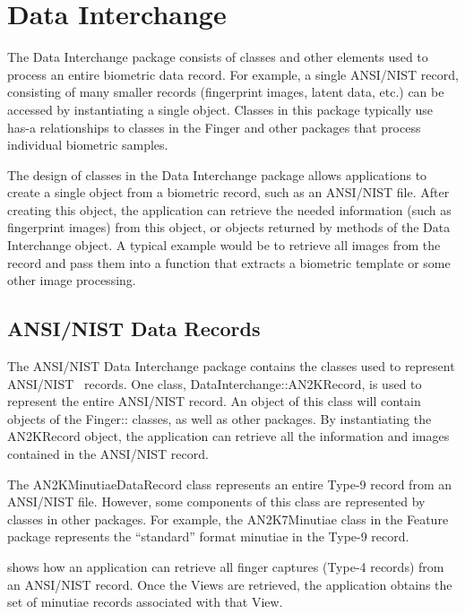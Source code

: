 %
%
\chapter{Data Interchange}
\label{chp-datainterchange}
The Data Interchange package consists of classes and other elements used to
process an entire biometric data record. For example, a single ANSI/NIST 
record, consisting of many smaller records (fingerprint images, latent data,
etc.) can be accessed by instantiating a single object. Classes in this
package typically use has-a relationships to classes in the Finger and other
packages that process individual biometric samples.

The design of classes in the Data Interchange package allows applications to
create a single object from a biometric record, such as an ANSI/NIST file.
After creating this object, the application can retrieve the needed information
(such as fingerprint images) from this object, or objects returned by methods
of the Data Interchange object. A typical example would be to retrieve all
images from the record and pass them into a function that extracts a biometric
template or some other image processing.

\section{ANSI/NIST Data Records}
\label{sec-ansinistdatarecords}

The ANSI/NIST Data Interchange package contains the classes used to represent
ANSI/NIST~\cite{std:an2k} records. One class, DataInterchange::AN2KRecord,
is used to represent the entire ANSI/NIST record. An object of this class
will contain objects of the Finger:: classes, as well as other packages. By
instantiating the AN2KRecord object, the application can retrieve all the
information and images contained in the ANSI/NIST record.

The AN2KMinutiaeDataRecord class represents an entire Type-9 record from an
ANSI/NIST file. However, some components of this class are represented by
classes in other packages. For example, the AN2K7Minutiae class in the Feature
package represents the ``standard'' format minutiae in the Type-9 record.

 shows how an application can retrieve all finger
captures (Type-4 records) from an ANSI/NIST record. Once the Views are
retrieved, the application obtains the set of minutiae records associated with
that View.

